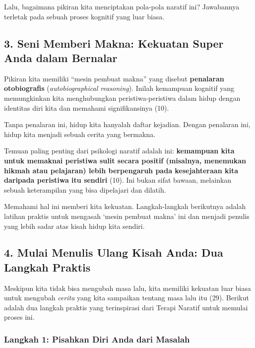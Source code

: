 \documentclass[
  letterpaper,
  DIV=11,
  numbers=noendperiod]{scrreprt}
\begin{document}
Lalu, bagaimana pikiran kita menciptakan pola-pola naratif ini?
Jawabannya terletak pada sebuah proses kognitif yang luar biasa.

\subsection{\texorpdfstring{\textbf{3. Seni Memberi Makna: Kekuatan
Super Anda dalam
Bernalar}}{3. Seni Memberi Makna: Kekuatan Super Anda dalam Bernalar}}\label{seni-memberi-makna-kekuatan-super-anda-dalam-bernalar}

Pikiran kita memiliki ``mesin pembuat makna'' yang disebut
\textbf{penalaran otobiografis} (\emph{autobiographical reasoning}).
Inilah kemampuan kognitif yang memungkinkan kita menghubungkan
peristiwa-peristiwa dalam hidup dengan identitas diri kita dan memahami
signifikansinya (10).

Tanpa penalaran ini, hidup kita hanyalah daftar kejadian. Dengan
penalaran ini, hidup kita menjadi sebuah cerita yang bermakna.

Temuan paling penting dari psikologi naratif adalah ini:
\textbf{kemampuan kita untuk memaknai peristiwa sulit secara positif
(misalnya, menemukan hikmah atau pelajaran) lebih berpengaruh pada
kesejahteraan kita daripada peristiwa itu sendiri} (10). Ini bukan sifat
bawaan, melainkan sebuah keterampilan yang bisa dipelajari dan dilatih.

Memahami hal ini memberi kita kekuatan. Langkah-langkah berikutnya
adalah latihan praktis untuk mengasah `mesin pembuat makna' ini dan
menjadi penulis yang lebih sadar atas kisah hidup kita sendiri.

\subsection{\texorpdfstring{\textbf{4. Mulai Menulis Ulang Kisah Anda:
Dua Langkah
Praktis}}{4. Mulai Menulis Ulang Kisah Anda: Dua Langkah Praktis}}\label{mulai-menulis-ulang-kisah-anda-dua-langkah-praktis}

Meskipun kita tidak bisa mengubah masa lalu, kita memiliki kekuatan luar
biasa untuk mengubah \emph{cerita} yang kita sampaikan tentang masa lalu
itu (29). Berikut adalah dua langkah praktis yang terinspirasi dari
Terapi Naratif untuk memulai proses ini.

\subsubsection{Langkah 1: Pisahkan Diri Anda dari
Masalah}\label{langkah-1-pisahkan-diri-anda-dari-masalah}
\end{document}
